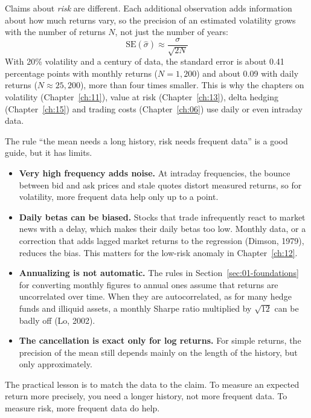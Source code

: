 Claims about \emph{risk} are different. Each additional observation adds information about how much returns vary, so the precision of an estimated volatility grows with the number of returns $N$, not just the number of years:
\begin{equation}
  \mathrm{SE}(\hat{\sigma}) \approx \frac{\sigma}{\sqrt{2N}} \nonumber
\end{equation}
With 20\% volatility and a century of data, the standard error is about 0.41 percentage points with monthly returns ($N = 1{,}200$) and about 0.09 with daily returns ($N \approx 25{,}200$), more than four times smaller. This is why the chapters on volatility (Chapter~\ref{ch:11}), value at risk (Chapter~\ref{ch:13}), delta hedging (Chapter~\ref{ch:15}) and trading costs (Chapter~\ref{ch:06}) use daily or even intraday data.

The rule ``the mean needs a long history, risk needs frequent data'' is a good guide, but it has limits.
\begin{itemize}
  \item \textbf{Very high frequency adds noise.} At intraday frequencies, the bounce between bid and ask prices and stale quotes distort measured returns, so for volatility, more frequent data help only up to a point.
  \item \textbf{Daily betas can be biased.} Stocks that trade infrequently react to market news with a delay, which makes their daily betas too low. Monthly data, or a correction that adds lagged market returns to the regression (Dimson, 1979), reduces the bias. This matters for the low-risk anomaly in Chapter~\ref{ch:12}.
  \item \textbf{Annualizing is not automatic.} The rules in Section~\ref{sec:01-foundations} for converting monthly figures to annual ones assume that returns are uncorrelated over time. When they are autocorrelated, as for many hedge funds and illiquid assets, a monthly Sharpe ratio multiplied by $\sqrt{12}$ can be badly off (Lo, 2002).
  \item \textbf{The cancellation is exact only for log returns.} For simple returns, the precision of the mean still depends mainly on the length of the history, but only approximately.
\end{itemize}

The practical lesson is to match the data to the claim. To measure an expected return more precisely, you need a longer history, not more frequent data. To measure risk, more frequent data do help.


